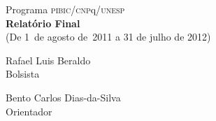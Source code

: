 \documentclass[a4paper,oneside,article]{memoir}
\newcommand{\unesp}{\textsc{unesp}}
\newcommand{\pibic}{\textsc{pibic}}
\newcommand{\cnpq}{\textsc{cnp}q}
\begin{document}
\frenchspacing

  \begin{flushleft}
  {\large
  Programa \pibic/\cnpq/\unesp\\
  \textbf{Relatório Final}\\}
  (De 1\textordmasculine\ de agosto de~2011 a 31 de julho de 2012)\\
  \end{flushleft}

  \begin{flushright}
  Rafael Luis Beraldo\\
  {\small Bolsista}

  \vspace{1em}

  Bento Carlos Dias-da-Silva\\
  {\small Orientador}
  \end{flushright}

\nocite{cruse,bento,bentoetal,eurowordnet,fellbaum,ferreira,flexner,handke,houaissweb,houaiss,levin,marrafa,miller,saint,scott,taylor,vossen,weiszflog,wordnet,git,riemer,vossenetal}











\renewcommand{\chaptername}{Apêndice}

\renewcommand{\chaptername}{Anexo}

\end{document}
